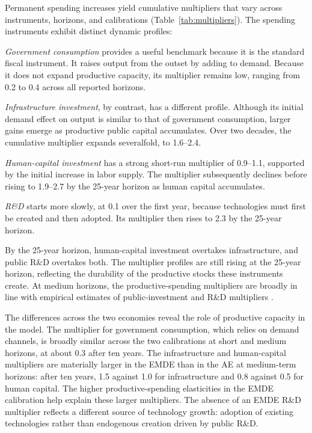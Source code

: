 \documentclass[a4paper,11pt]{article}
\begin{document}
Permanent spending increases yield cumulative multipliers that vary across instruments, horizons, and calibrations (Table~\ref{tab:multipliers}).
The spending instruments exhibit distinct dynamic profiles:
\begin{inparaenum}[(i)]
\item \emph{Government consumption} provides a useful benchmark because it is the standard fiscal instrument.
It raises output from the outset by adding to demand.
Because it does not expand productive capacity, its multiplier remains low, ranging from 0.2 to 0.4 across all reported horizons.
\item \emph{Infrastructure investment}, by contrast, has a different profile.
Although its initial demand effect on output is similar to that of government consumption, larger gains emerge as productive public capital accumulates.
Over two decades, the cumulative multiplier expands severalfold, to 1.6--2.4.
\item \emph{Human-capital investment} has a strong short-run multiplier of 0.9--1.1, supported by the initial increase in labor supply.
The multiplier subsequently declines before rising to 1.9--2.7 by the 25-year horizon as human capital accumulates.
\item \emph{R\&D} starts more slowly, at 0.1 over the first year, because technologies must first be created and then adopted.
Its multiplier then rises to 2.3 by the 25-year horizon.
\end{inparaenum}
By the 25-year horizon, human-capital investment overtakes infrastructure, and public R\&D overtakes both.
The multiplier profiles are still rising at the 25-year horizon, reflecting the durability of the productive stocks these instruments create.
At medium horizons, the productive-spending multipliers are broadly in line with empirical estimates of public-investment and R\&D multipliers \citep{Ramey2020, AfonsoRodrigues2024, FieldhouseMertens2023}.

The differences across the two economies reveal the role of productive capacity in the model.
The multiplier for government consumption, which relies on demand channels, is broadly similar across the two calibrations at short and medium horizons, at about 0.3 after ten years.
The infrastructure and human-capital multipliers are materially larger in the EMDE than in the AE at medium-term horizons: after ten years, 1.5 against 1.0 for infrastructure and 0.8 against 0.5 for human capital.
The higher productive-spending elasticities in the EMDE calibration help explain these larger multipliers.
The absence of an EMDE R\&D multiplier reflects a different source of technology growth: adoption of existing technologies rather than endogenous creation driven by public R\&D.
\end{document}
